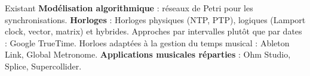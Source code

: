 \begin{block}{Existant}
\textbf{Modélisation algorithmique} : réseaux de Petri pour les synchronisations. 
\textbf{Horloges} : Horloges physiques (NTP, PTP), logiques (Lamport clock, vector, matrix) et hybrides.
Approches par intervalles plutôt que par dates : Google TrueTime.
Horloes adaptées à la gestion du temps musical : Ableton Link, Global Metronome.
\textbf{Applications musicales réparties} : Ohm Studio, Splice, Supercollider.
\end{block}